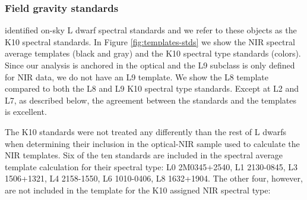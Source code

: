 \documentclass[12pt,preprint]{aastex}
\begin{document}
\subsubsection{Field gravity standards}
\citet{Kirkpatrick10} identified on-sky L dwarf spectral standards and we refer to these objects as the K10 spectral standards. In Figure \ref{fig:templates-stds} we show the NIR spectral average templates (black and gray) and the K10 spectral type standards (colors). 
Since our analysis is anchored in the optical and the L9 subclass is only defined for NIR data, we do not have an L9 template.
We show the L8 template compared to both the L8 and L9 K10 spectral type standards.
Except at L2 and L7, as described below, the agreement between the standards and the templates is excellent. 

The K10 standards were not treated any differently than the rest of L dwarfs when determining their inclusion in the optical-NIR sample used to calculate the NIR templates. 
Six of the ten standards are included in the spectral average template calculation for their spectral type: L0 2M0345+2540, L1 2130-0845, L3 1506+1321, L4 2158-1550, L6 1010-0406, L8 1632+1904.
The other four, however, are not included in the template for the K10 assigned NIR spectral type:
\end{document}
